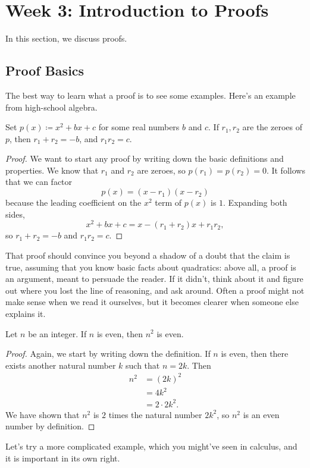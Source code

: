 \documentclass[../main.tex]{subfiles}
\begin{document}
\section{Week 3: Introduction to Proofs}
In this section, we discuss proofs.

\subsection{Proof Basics}
The best way to learn what a proof is to see some examples. Here's an example from high-school algebra.
\begin{example}
    Set $p(x) \coloneqq x^2 + bx + c$ for some real numbers $b$ and $c$. If $r_1,r_2$ are the zeroes of $p$, then $r_1 + r_2 = -b$, and $r_1r_2 = c$.
\end{example}
\begin{proof}
    We want to start any proof by writing down the basic definitions and properties. We know that $r_1$ and $r_2$ are zeroes, so $p(r_1) = p(r_2) = 0$. It follows that we can factor
    \[p(x)=(x-r_1)(x-r_2)\]
    because the leading coefficient on the $x^2$ term of $p(x)$ is $1$. Expanding both sides,
    \[x^2 + bx + c = x - (r_1 + r_2)x + r_1r_2,\]
    so $r_1 + r_2 = -b$ and $r_1r_2 = c$.
\end{proof}
That proof should convince you beyond a shadow of a doubt that the claim is true, assuming that you know basic facts about quadratics: above all, a proof is an argument, meant to persuade the reader. If it didn't, think about it and figure out where you lost the line of reasoning, and ask around. Often a proof might not make sense when we read it ourselves, but it becomes clearer when someone else explains it.
\begin{example} \label{exe:squares-even}
    Let $n$ be an integer. If $n$ is even, then $n^2$ is even.
\end{example}
\begin{proof}
    Again, we start by writing down the definition. If $n$ is even, then there exists another natural number $k$ such that $n = 2k$. Then
    \begin{align*}
        n^2 &= (2k)^2\\
        &= 4k^2\\
        &= 2 \cdot 2k^2.
    \end{align*}
    We have shown that $n^2$ is $2$ times the natural number $2k^2$, so $n^2$ is an even number by definition.
\end{proof}
Let's try a more complicated example, which you might've seen in calculus, and it is important in its own right.
\end{document}
